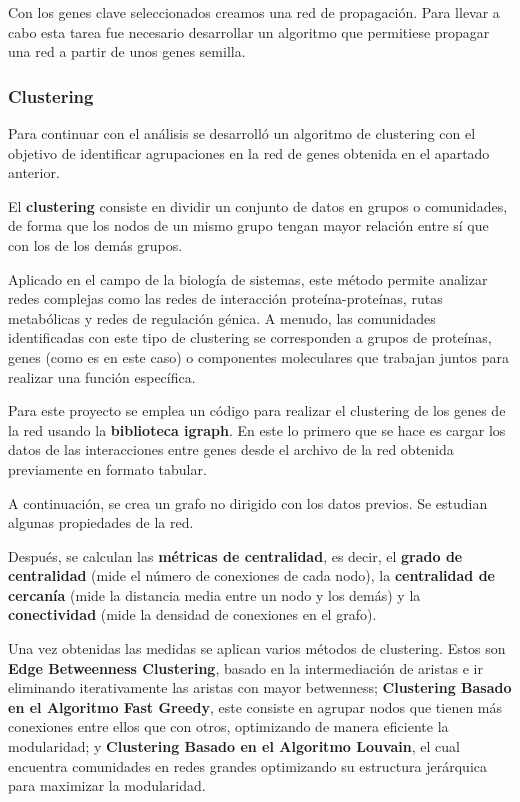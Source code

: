 Con los genes clave seleccionados creamos una red de propagación. Para llevar a cabo esta tarea fue necesario desarrollar un algoritmo que permitiese propagar una red a partir de unos genes semilla.


\subsubsection{Clustering}


Para continuar con el análisis se desarrolló un algoritmo de clustering con el objetivo de identificar agrupaciones en la red de genes obtenida en el apartado anterior.


El \textbf{clustering} consiste en dividir un conjunto de datos en grupos o comunidades, de forma que los nodos de un mismo grupo tengan mayor relación entre sí que con los de los demás grupos.

Aplicado en el campo de la biología de sistemas, este método permite analizar redes complejas como las redes de interacción proteína-proteínas, rutas metabólicas y redes de regulación génica. A menudo, las comunidades identificadas con este tipo de clustering se corresponden a grupos de proteínas, genes (como es en este caso) o componentes moleculares que trabajan juntos para realizar una función específica.

Para este proyecto se emplea un código para realizar el clustering de los genes de la red usando la \textbf{biblioteca igraph}. En este lo primero que se hace es cargar los datos de las interacciones entre genes desde el archivo de la red obtenida previamente en formato tabular.

A continuación, se crea un grafo no dirigido con los datos previos. Se estudian algunas propiedades de la red.

Después, se calculan las \textbf{métricas de centralidad}, es decir, el \textbf{grado de centralidad} (mide el número de conexiones de cada nodo), la \textbf{centralidad de cercanía} (mide la distancia media entre un nodo y los demás) y la \textbf{conectividad} (mide la densidad de conexiones en el grafo).

Una vez obtenidas las medidas se aplican varios métodos de clustering. Estos son \textbf{Edge Betweenness Clustering}, basado en la intermediación de aristas e ir eliminando iterativamente las aristas con mayor betwenness; \textbf{Clustering Basado en el Algoritmo Fast Greedy}, este consiste en agrupar nodos que tienen más conexiones entre ellos que con otros, optimizando de manera eficiente la modularidad; y \textbf{Clustering Basado en el Algoritmo Louvain}, el cual encuentra comunidades en redes grandes optimizando su estructura jerárquica para maximizar la modularidad.

